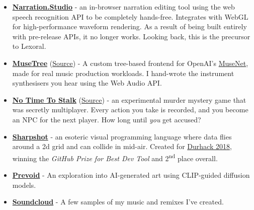 \documentclass[hidelinks, 12pt, a4paper]{article}
\begin{document}
	\begin{itemize}
		\item \begin{small}\href{https://github.com/stevenwaterman/narration.studio}{\textbf{Narration.Studio}} - an in-browser narration editing tool using the web speech recognition API to be completely hands-free. Integrates with WebGL for high-performance waveform rendering. As a result of being built entirely with pre-release APIs, it no longer works. Looking back, this is the precursor to Lexoral.\end{small}
		
		\item \begin{small} \href{https://stevenwaterman.uk/musetree/}{\textbf{MuseTree}} (\href{https://github.com/stevenwaterman/musetree}{Source}) - A custom tree-based frontend for OpenAI's \href{https://openai.com/blog/musenet/}{MuseNet}, made for real music production workloads. I hand-wrote the instrument synthesisers you hear using the Web Audio API.\end{small}
		
		\item \begin{small}\href{https://stevenwaterman.uk/NoTimeToStalk}{\textbf{No Time To Stalk}} (\href{https://github.com/stevenwaterman/NoTimeToStalk}{Source}) - an experimental murder mystery game that was secretly multiplayer. Every action you take is recorded, and you become an NPC for the next player. How long until \emph{you} get accused?\end{small}
		
		\item \begin{small}\href{https://github.com/stevenwaterman/sharpshot}{\textbf{Sharpshot}} - an esoteric visual programming language where data flies around a 2d grid and can collide in mid-air. Created for \href{http://www.durhack.com}{Durhack 2018}, winning the \emph{GitHub Prize for Best Dev Tool} and 2\textsuperscript{nd} place overall.\end{small}
		
		\item \begin{small}\href{https://linktr.ee/prevoid_art}{\textbf{Prevoid}} - An exploration into AI-generated art using CLIP-guided diffusion models.\end{small}
		
		\item \begin{small}\href{https://soundcloud.com/user-872603169/welcome-to-the-theatre}{\textbf{Soundcloud}} - A few samples of my music and remixes I've created.\end{small}
	\end{itemize}
\end{document}
